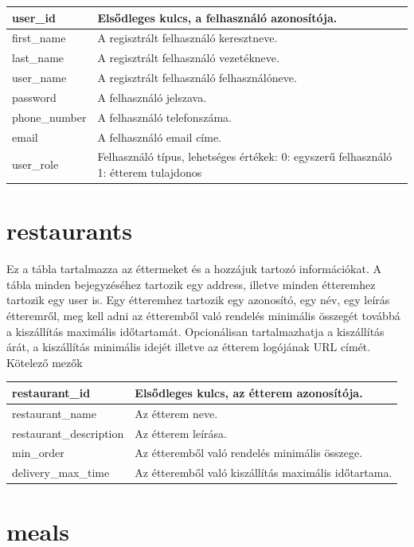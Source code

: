 \begin{tabular}{|p{3cm}|p{10cm}|}
\hline
user\_id & Elsődleges kulcs, a felhasználó azonosítója. \\
\hline
first\_name & A regisztrált felhasználó keresztneve. \\
\hline
last\_name & A regisztrált felhasználó vezetékneve. \\
\hline
user\_name & A regisztrált felhasználó felhasználóneve. \\
\hline
password & A felhasználó jelszava. \\
\hline
phone\_number & A felhasználó telefonszáma. \\
\hline
email & A felhasználó email címe. \\
\hline
user\_role & Felhasználó típus, lehetséges értékek: 0: egyszerű felhasználó 1: étterem tulajdonos \\
\hline
\end{tabular}

\section{restaurants}

Ez a tábla tartalmazza az éttermeket és a hozzájuk tartozó információkat. A tábla minden bejegyzéséhez tartozik egy address, illetve minden étteremhez tartozik egy user is. Egy étteremhez tartozik egy azonosító, egy név, egy leírás étteremről, meg kell adni az étteremből való rendelés minimális összegét továbbá a kiszállítás maximális időtartamát. Opcionálisan tartalmazhatja a kiszállítás árát, a kiszállítás minimális idejét illetve az étterem logójának URL címét.
Kötelező mezők

\begin{tabular}{|p{3cm}|p{10cm}|}
    \hline
    restaurant\_id & Elsődleges kulcs, az étterem azonosítója. \\
    \hline
    restaurant\_name & Az étterem neve. \\
    \hline
    restaurant\_description & Az étterem leírása. \\
    \hline
    min\_order & Az étteremből való rendelés minimális összege. \\
    \hline
    delivery\_max\_time & Az étteremből való kiszállítás maximális időtartama. \\
    \hline
\end{tabular}

\section{meals}


